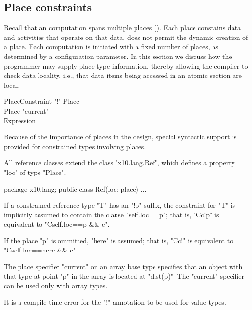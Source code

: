 \subsection{Place constraints}\label{PlaceTypes}
\label{DepType:PlaceType}

Recall that an \Xten{} computation spans multiple places
(). Each place constains data and activities that
operate on that data.  \XtenCurrVer{} does not permit the dynamic
creation of a place. Each \Xten{} computation is initiated with a
fixed number of places, as determined by a configuration parameter.
In this section we discuss how the programmer may supply place type
information, thereby allowing the compiler to check data locality,
i.e., that data items being accessed in an atomic section are local.

\begin{grammar}
PlaceConstraint     \: \xcd"!" Place\opt \\
Place              \:  \xcd"current" \\
                        \| Expression \\
\end{grammar}

Because of the importance of places in the \Xten{} design, special
syntactic support is provided for constrained types involving places.

All \Xten{} reference classes extend the class
\xcd"x10.lang.Ref", which defines a property
\xcd"loc" of type
\xcd"Place".

\begin{xten}
package x10.lang;
public class Ref(loc: place) { ... }  
\end{xten}

If a constrained reference type \xcd"T" has an \xcd"!p" suffix,
the constraint for \xcd"T" is implicitly assumed to contain the clause
\xcd"self.loc==p"; that is,
\xcd"C{c}!p" is equivalent to \xcd"C{self.loc==p && c}".

If the place \xcd"p" is ommitted, \xcd"here" is assumed; that is,
\xcd"C{c}!" is equivalent to \xcd"C{self.loc==here && c}".


The place specifier \xcd"current" on an array base type
specifies that an object with that type at point \xcd"p"
in the array 
is located at \xcd"dist(p)".  The \xcd"current" specifier can be
used only with array types.

\begin{staticrule*}
  It is a compile time error for the \xcd"!"-annotation to
  be used for value types.
\end{staticrule*}

